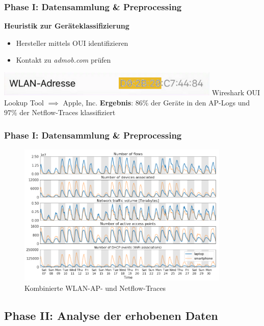 \documentclass{beamer}
\begin{document}
\begin{frame}
  \frametitle{Phase I: Datensammlung \& Preprocessing}
  \textbf{Heuristik zur Geräteklassifizierung}
  \begin{itemize}
    \item Hersteller mittels OUI identifizieren
    \item Kontakt zu \textit{admob.com} prüfen
  \end{itemize}
  \includegraphics[width=0.8\textwidth]{images/MAC_iPhone.png}\newline
  Wireshark OUI Lookup Tool $\implies$ Apple, Inc.\newline\newline
  \textbf{Ergebnis}: $86\%$ der Geräte in den AP-Logs und $97\%$ der Netflow-Traces klassifiziert
\end{frame}

\begin{frame}
  \frametitle{Phase I: Datensammlung \& Preprocessing}
  \begin{figure}
    \centering
    \includegraphics[width=0.9\textwidth]{images/traces.png}
    \caption*{Kombinierte WLAN-AP- und Netflow-Traces}
  \end{figure}  
\end{frame}

\subsection{\textbf{Phase II}: Analyse der erhobenen Daten}
\end{document}
